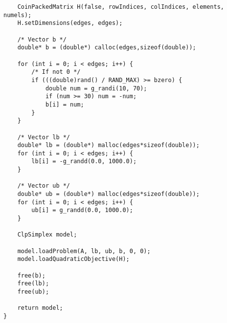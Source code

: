 \begin{verbatim}
    CoinPackedMatrix H(false, rowIndices, colIndices, elements, numels);
    H.setDimensions(edges, edges);

    /* Vector b */
    double* b = (double*) calloc(edges,sizeof(double));

    for (int i = 0; i < edges; i++) {
        /* If not 0 */
        if (((double)rand() / RAND_MAX) >= bzero) {
            double num = g_randi(10, 70);
            if (num >= 30) num = -num;
            b[i] = num;
        }
    }

    /* Vector lb */
    double* lb = (double*) malloc(edges*sizeof(double));
    for (int i = 0; i < edges; i++) {
        lb[i] = -g_randd(0.0, 1000.0);
    }

    /* Vector ub */
    double* ub = (double*) malloc(edges*sizeof(double));
    for (int i = 0; i < edges; i++) {
        ub[i] = g_randd(0.0, 1000.0);
    }

    ClpSimplex model;

    model.loadProblem(A, lb, ub, b, 0, 0);
    model.loadQuadraticObjective(H);

    free(b);
    free(lb);
    free(ub);

    return model;
}
\end{verbatim}
